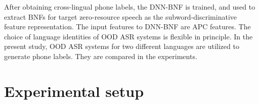 \documentclass[a4paper]{article}
\begin{document}

After obtaining cross-lingual  phone labels, the DNN-BNF is trained, and used to  extract BNFs for target zero-resource speech as the subword-discriminative feature representation. 
The input features to DNN-BNF are APC features. 
The choice of language identities of OOD ASR systems is flexible in principle. 
In the present study, OOD ASR systems for two different languages are utilized to generate phone labels. They are compared in the experiments.


\section{Experimental setup}
\end{document}
